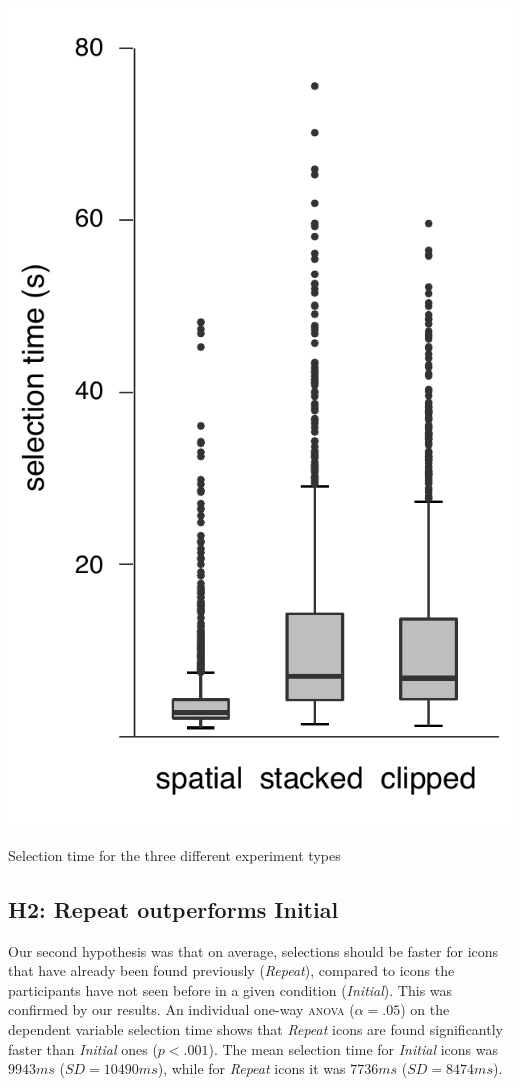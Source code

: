 \documentclass{tufte-book} %
\begin{document}
\begin{marginfigure}
  \includegraphics[width=\linewidth]{duration-types.pdf}
  \caption{Selection time for the three different experiment types}
  \label{fig:duration-types}
\end{marginfigure}

\subsection{H2: Repeat outperforms Initial}
Our second hypothesis was that on average, selections should be faster for icons that have already been found previously (\emph{Repeat}), compared to icons the participants have not seen before in a given condition (\emph{Initial}). This was confirmed by our results. An individual one-way \textsc{anova} ($\alpha = .05$) on the dependent variable selection time shows that \emph{Repeat} icons are found significantly faster than \emph{Initial} ones ($p < .001$). The mean selection time for \emph{Initial} icons was $9943 ms$ ($SD = 10490 ms$), while for \emph{Repeat} icons it was $7736 ms$ ($SD = 8474 ms$).
\end{document}
